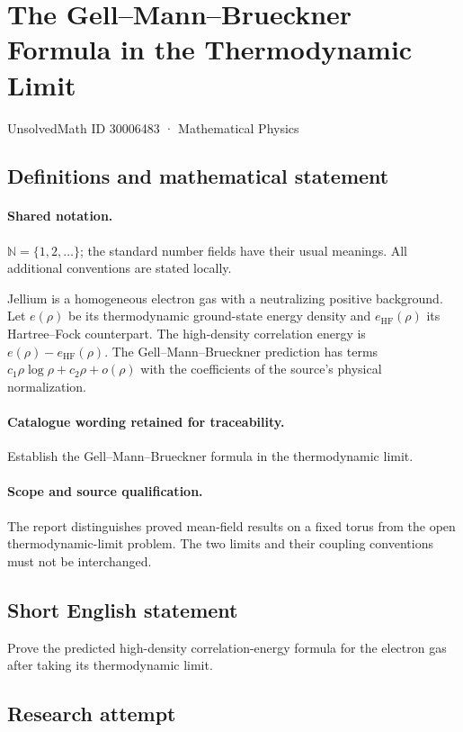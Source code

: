 \documentclass[11pt]{article}
\begin{document}
\setcounter{section}{30006482}
\section{The Gell–Mann–Brueckner Formula in the Thermodynamic Limit}\label{30006483}
{\small UnsolvedMath ID 30006483 · Mathematical Physics}
\subsection{Definitions and mathematical statement}

\paragraph{Shared notation.}$\mathbb N=\{1,2,\ldots\}$; the standard number fields have their usual meanings. All additional conventions are stated locally.


Jellium is a homogeneous electron gas with a neutralizing positive background. Let $e(\rho)$ be its thermodynamic ground-state energy density and $e_{\mathrm{HF}}(\rho)$ its Hartree--Fock counterpart. The high-density correlation energy is $e(\rho)-e_{\mathrm{HF}}(\rho)$. The Gell--Mann--Brueckner prediction has terms $c_1\rho\log\rho+c_2\rho+o(\rho)$ with the coefficients of the source's physical normalization.

\paragraph{Catalogue wording retained for traceability.}
Establish the Gell–Mann–Brueckner formula in the thermodynamic limit.

\paragraph{Scope and source qualification.}The report distinguishes proved mean-field results on a fixed torus from the open thermodynamic-limit problem. The two limits and their coupling conventions must not be interchanged.
\subsection{Short English statement}
Prove the predicted high-density correlation-energy formula for the electron gas after taking its thermodynamic limit.
\subsection{Research attempt}
\end{document}
